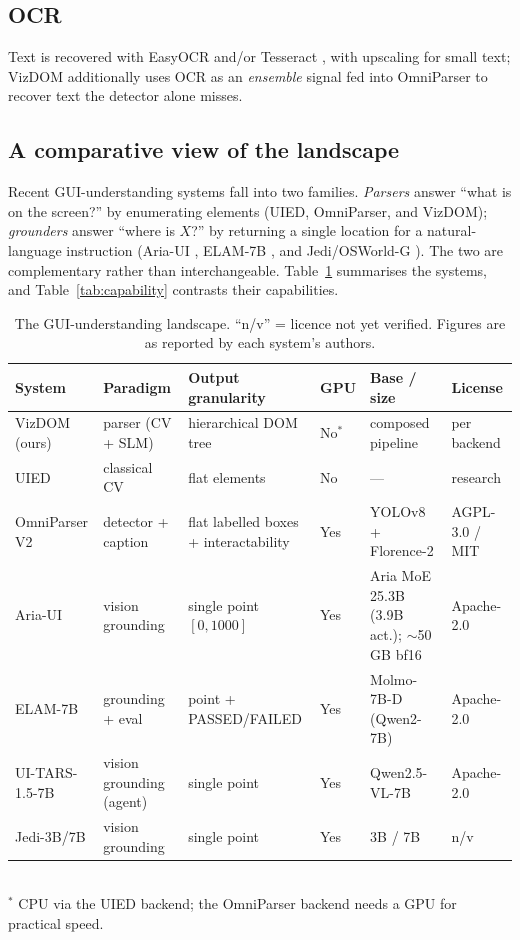 \documentclass[11pt,a4paper]{article}
\begin{document}
\subsection{OCR}
Text is recovered with EasyOCR \cite{easyocr} and/or Tesseract \cite{tesseract},
with upscaling for small text; VizDOM additionally uses OCR as an \emph{ensemble}
signal fed into OmniParser to recover text the detector alone misses.

\subsection{A comparative view of the landscape}
Recent GUI-understanding systems fall into two families. \emph{Parsers} answer
``what is on the screen?'' by enumerating elements (UIED, OmniParser, and VizDOM);
\emph{grounders} answer ``where is $X$?'' by returning a single location for a
natural-language instruction (Aria-UI \cite{ariaui2024}, ELAM-7B \cite{elam7b}, and
Jedi/OSWorld-G \cite{osworldg}). The two are complementary rather than
interchangeable. Table~\ref{tab:models} summarises the systems, and
Table~\ref{tab:capability} contrasts their capabilities.

\begin{table}[H]
  \centering\footnotesize
  \caption{The GUI-understanding landscape. ``n/v'' = licence not yet verified.
  Figures are as reported by each system's authors.}
  \label{tab:models}
  \begin{tabular}{@{}p{2.4cm}p{2.5cm}p{2.7cm}p{0.8cm}p{2.3cm}p{2.0cm}@{}}
    \toprule
    System & Paradigm & Output granularity & GPU & Base / size & License \\
    \midrule
    VizDOM (ours) & parser (CV + SLM) & hierarchical DOM tree & No$^\ast$ & composed pipeline & per backend \\
    UIED & classical CV & flat elements & No & --- & research \\
    OmniParser V2 & detector + caption & flat labelled boxes + interactability & Yes & YOLOv8 + Florence-2 & AGPL-3.0 / MIT \\
    Aria-UI & vision grounding & single point $[0,1000]$ & Yes & Aria MoE 25.3B (3.9B act.); $\sim$50\,GB bf16 & Apache-2.0 \\
    ELAM-7B & grounding + eval & point + PASSED/FAILED & Yes & Molmo-7B-D (Qwen2-7B) & Apache-2.0 \\
    UI-TARS-1.5-7B \cite{uitars2025} & vision grounding (agent) & single point & Yes & Qwen2.5-VL-7B & Apache-2.0 \\
    Jedi-3B/7B & vision grounding & single point & Yes & 3B / 7B & n/v \\
    \bottomrule
  \end{tabular}\\[0.3em]
  {\footnotesize $^\ast$ CPU via the UIED backend; the OmniParser backend needs a GPU for practical speed.}
\end{table}
\end{document}
